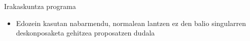 \documentclass[
 10pt,%
 compress,%
 t,       %
 xcolor=svgnames
]{beamer}
\theoremstyle{definition} \newtheorem{definicion}{Definicion}[section]
\theoremstyle{propiedades} \newtheorem{propiedades}{Propiedades}[section]
\begin{document}
\begin{frame}{Irakaskuntza programa}
{\begin{itemize}
			\medskip
			\item Edozein kasutan nabarmendu, normalean lantzen ez den balio singularren deskonposaketa gehitzea proposatzen dudala
			
			
			
			
			
			
		\end{itemize}
		
		
		
	}
	
\end{frame}


\end{document}
